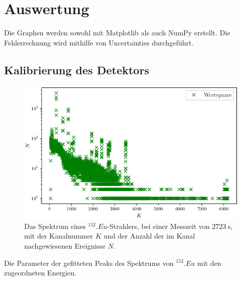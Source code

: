 \section{Auswertung}
\label{sec:Auswertung}

Die Graphen werden sowohl mit Matplotlib \cite{matplotlib} als auch NumPy \cite{numpy} erstellt. Die Fehlerrechnung wird mithilfe von Uncertainties \cite{uncertainties} durchgeführt.

\subsection{Kalibrierung des Detektors}

\begin{figure}
	\centering
	\includegraphics[width=\linewidth-70pt,height=\textheight-70pt,keepaspectratio]{content/images//EU152_1-8192.png}
	\caption{Das Spektrum eines $^{152}.{Eu}$-Strahlers, bei einer Messzeit von $\SI{2723}{\second}$, mit der Kanalnummer $K$ und der Anzahl der im Kanal nachgewiesenen Ereignisse $N$.}
	\label{fig:SpektrumEu}
\end{figure}

\begin{table}
	\centering
	\caption{Die Parameter der gefitteten Peaks des Spektrums von $^{152}.{Eu}$ mit den zugeordneten Energien.}
	
	\label{tab:parameterEu}
\end{table}

